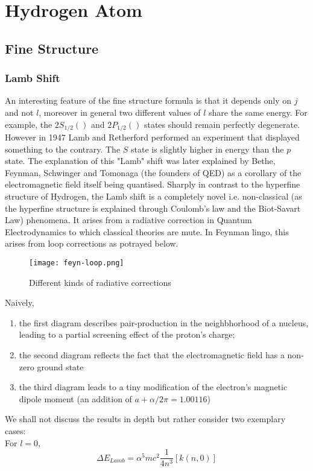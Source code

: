 \chapter{Hydrogen Atom}
\section{Fine Structure}
\subsection{Lamb Shift}
An interesting feature of the fine structure formula is that it depends only on $j$ and not $l$, moreover in general two different values of $l$ share the same energy. For example, the $2S_{1/2} ()$ and $2P_{1/2} ()$ states should remain perfectly degenerate. However in 1947 Lamb and Retherford performed an experiment that displayed something to the contrary. The $S$ state is slightly higher in energy than the $p$ state. The explanation of this "Lamb" shift was later explained by Bethe, Feynman, Schwinger and Tomonaga (the founders of QED) as a corollary of the electromagnetic field itself being quantised.  Sharply in contrast to the hyperfine structure of Hydrogen, the Lamb shift is a completely novel i.e. non-classical (as the hyperfine structure is explained through Coulomb's law and the Biot-Savart Law) phenomena. It arises from a radiative correction in Quantum Electrodynamics to which classical theories are mute. In Feynman lingo, this arises from loop corrections as potrayed below.
\begin{figure}[h]
	\centering
	\texttt{[image: feyn-loop.png]}
	\caption{Different kinds of radiative corrections}
\end{figure}
Naively,
\begin{enumerate}
\item the first diagram describes pair-production in the neighbhorhood of a nucleus, leading to a partial screening effect of the proton's charge;
\item the second diagram reflects the fact that the electromagnetic field has a non-zero ground state
\item the third diagram leads to a tiny modification of the electron's magnetic dipole moment (an addition of $a + \alpha/2\pi = 1.00116$)
\end{enumerate}
We shall not discuss the results in depth but rather consider two exemplary cases:\\
For $ l = 0$,
\begin{equation}
	\Delta E_{Lamb} = \alpha^{5}mc^{2}\frac{1}{4n^{3}}\left[k(n,0)\right]
\end{equation}
